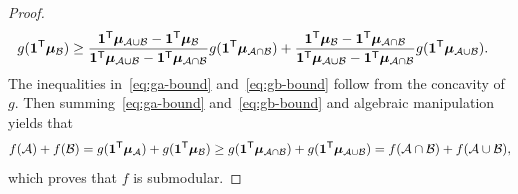 \documentclass[10pt]{article} %
\begin{document}
\begin{proof}
\begin{align}
    g(\bm{1}^{\mathsf{T}}\bm{\mu}_{\mathcal{B}})
    &\ge
      \frac{\bm{1}^{\mathsf{T}}\bm{\mu}_{\mathcal{A} \cup \mathcal{B}} - \bm{1}^{\mathsf{T}}\bm{\mu}_{\mathcal{B}}}{\bm{1}^{\mathsf{T}}\bm{\mu}_{\mathcal{A} \cup \mathcal{B}} - \bm{1}^{\mathsf{T}}\bm{\mu}_{\mathcal{A} \cap \mathcal{B}}} g(\bm{1}^{\mathsf{T}}\bm{\mu}_{\mathcal{A} \cap \mathcal{B}}) + 
      \frac{\bm{1}^{\mathsf{T}}\bm{\mu}_{\mathcal{B}} - \bm{1}^{\mathsf{T}}\bm{\mu}_{\mathcal{A} \cap \mathcal{B}}}{\bm{1}^{\mathsf{T}}\bm{\mu}_{\mathcal{A} \cup \mathcal{B}} - \bm{1}^{\mathsf{T}}\bm{\mu}_{\mathcal{A} \cap \mathcal{B}}} g(\bm{1}^{\mathsf{T}}\bm{\mu}_{\mathcal{A} \cup \mathcal{B}}).
  \end{align}
  The inequalities in~\eqref{eq:ga-bound} and~\eqref{eq:gb-bound} follow from the concavity of $g$. Then summing~\eqref{eq:ga-bound} and~\eqref{eq:gb-bound} and algebraic manipulation yields that 
  \[
    f(\mathcal{A}) + f(\mathcal{B})
    = g(\bm{1}^{\mathsf{T}}\bm{\mu}_{\mathcal{A}}) + g(\bm{1}^{\mathsf{T}}\bm{\mu}_{\mathcal{B}})
    \ge
      g(\bm{1}^{\mathsf{T}}\bm{\mu}_{\mathcal{A} \cap \mathcal{B}}) + 
      g(\bm{1}^{\mathsf{T}}\bm{\mu}_{\mathcal{A} \cup \mathcal{B}})
     = 
      f(\mathcal{A} \cap \mathcal{B}) + 
      f(\mathcal{A} \cup \mathcal{B}),
    \]
    which proves that $f$ is submodular. 
\end{proof}
\end{document}
